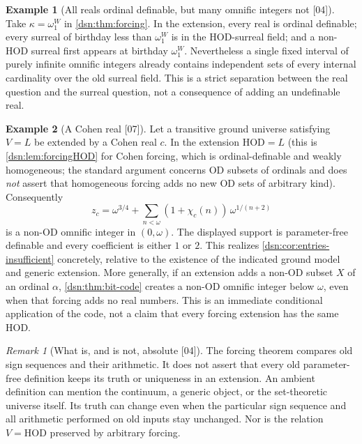 \documentclass[11pt,a4paper]{article}
\numberwithin{equation}{section}
\theoremstyle{definition}
\newtheorem{example}[example]{Example}
\theoremstyle{remark}
\newtheorem{remark}[remark]{Remark}
\newcommand{\OD}{\mathrm{OD}}
\newcommand{\HOD}{\mathrm{HOD}}
\newcommand{\src}[1]{\textup{\textsf{\small[#1]}}}
\begin{document}
\begin{example}[All reals ordinal definable, but many omnific integers not \src{04}]
Take $\kappa=\omega_1^W$ in \cref{dsn:thm:forcing}. In the
extension, every real is ordinal definable; every surreal of birthday
less than $\omega_1^W$ is in the $\HOD$-surreal field; and a non-$\HOD$
surreal first appears at birthday $\omega_1^W$. Nevertheless a
single fixed interval of purely infinite omnific integers already
contains independent sets of every internal cardinality over the
old surreal field. This is a strict separation between the real
question and the surreal question, not a consequence of adding an
undefinable real.
\end{example}

\begin{example}[A Cohen real \src{07}]\label{dsn:ex:cohen}
Let a transitive ground universe satisfying $V=L$ be extended by a Cohen
real $c$. In the extension $\HOD=L$ (this is \cref{dsn:lem:forcingHOD} for
Cohen forcing, which is ordinal-definable and weakly homogeneous; the
standard argument concerns $\OD$ subsets of ordinals and does \emph{not}
assert that homogeneous forcing adds no new $\OD$ sets of arbitrary
kind). Consequently
\[
 z_c=\omega^{3/4}+\sum_{n<\omega}(1+\chi_c(n))\,\omega^{1/(n+2)}
\]
is a non-$\OD$ omnific integer in $(0,\omega)$. The displayed support is
parameter-free definable and every coefficient is either $1$ or $2$. This
realizes \cref{dsn:cor:entries-insufficient} concretely, relative to the
existence of the indicated ground model and generic extension. More
generally, if an extension adds a non-$\OD$ subset $X$ of an ordinal
$\alpha$, \cref{dsn:thm:bit-code} creates a non-$\OD$ omnific integer below
$\omega$, even when that forcing adds no real numbers. This is an immediate
conditional application of the code, not a claim that every forcing
extension has the same $\HOD$.
\end{example}

\begin{remark}[What is, and is not, absolute \src{04}]
The forcing theorem compares old sign sequences and their arithmetic.
It does not assert that every old parameter-free definition keeps
its truth or uniqueness in an extension. An ambient definition can
mention the continuum, a generic object, or the set-theoretic
universe itself. Its truth can change even when the particular sign
sequence and all arithmetic performed on old inputs stay unchanged.
Nor is the relation $V=\HOD$ preserved by arbitrary forcing.
\end{remark}
\end{document}
